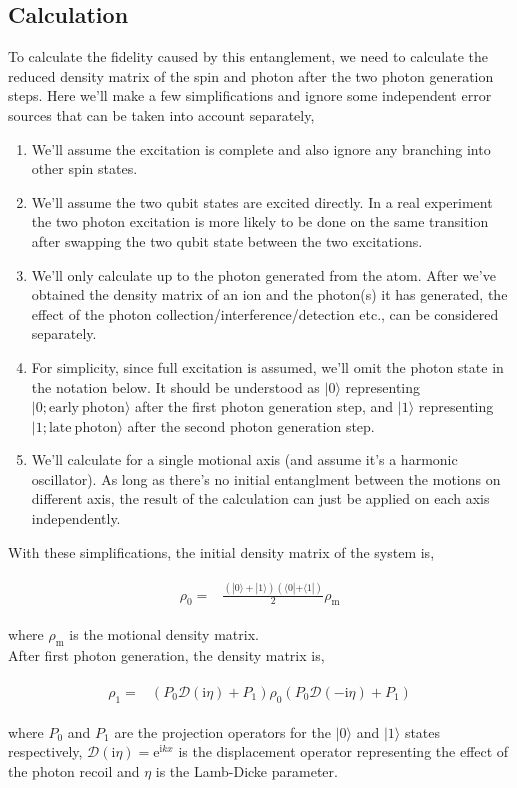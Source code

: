 \documentclass[10pt,fleqn]{article}
\newcommand{\ue}{\mathrm{e}}
\newcommand{\ui}{\mathrm{i}}
\newcommand{\eqar}[1]
{
  \begin{align}
    #1
  \end{align}
}
\newcommand{\paren}[1]{{\left({#1}\right)}}
\begin{document}
\subsection{Calculation}

To calculate the fidelity caused by this entanglement, we need to calculate
the reduced density matrix of the spin and photon after the two photon generation steps.
Here we'll make a few simplifications and ignore some independent error sources
that can be taken into account separately,
\begin{enumerate}
\item We'll assume the excitation is complete
  and also ignore any branching into other spin states.
\item We'll assume the two qubit states are excited directly.
  In a real experiment the two photon excitation is more likely to be done
  on the same transition after swapping the two qubit state between the two excitations.
\item We'll only calculate up to the photon generated from the atom.
  After we've obtained the density matrix of an ion and the photon(s) it has generated,
  the effect of the photon collection/interference/detection etc.,
  can be considered separately.
\item For simplicity, since full excitation is assumed,
  we'll omit the photon state in the notation below. It should be understood as
  $|0\rangle$ representing $|0;\mathrm{early\ photon}\rangle$ after the first photon
  generation step, and $|1\rangle$ representing $|1;\mathrm{late\ photon}\rangle$
  after the second photon generation step.
\item We'll calculate for a single motional axis
  (and assume it's a harmonic oscillator).
  As long as there's no initial entanglment between the motions on different axis,
  the result of the calculation can just be applied on each axis independently.
\end{enumerate}

With these simplifications, the initial density matrix of the system is,
\eqar{
  \begin{split}
    \rho_0=&\frac{\paren{|0\rangle+|1\rangle}\paren{\langle0|+\langle1|}}{2}\rho_{\mathrm{m}}
  \end{split}
}
where $\rho_{\mathrm{m}}$ is the motional density matrix.\\

After first photon generation, the density matrix is,
\eqar{
  \begin{split}
    \rho_1=&\paren{P_{0}\mathcal{D}(\ui\eta)+P_{1}}\rho_0\paren{P_{0}\mathcal{D}(-\ui\eta)+P_{1}}
  \end{split}
}
where $P_0$ and $P_1$ are the projection operators for the $|0\rangle$ and $|1\rangle$
states respectively, $\mathcal{D}(\ui\eta)=\ue^{\ui kx}$ is the displacement operator
representing the effect of the photon recoil and $\eta$ is the Lamb-Dicke parameter.\\
\end{document}
